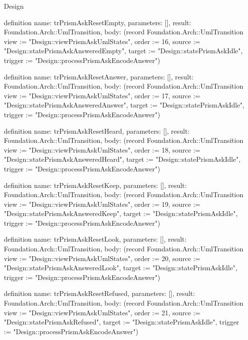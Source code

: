 \begin{lexlean}{Design}
\begin{semanticmodule}
definition{
  name: trPrismAskResetEmpty,
  parameters: [],
  result: Foundation.Arch::UmlTransition,
  body: (record Foundation.Arch::UmlTransition {view := "Design::viewPrismAskUmlStates", order := 16, source := "Design::statePrismAskAnsweredEmpty", target := "Design::statePrismAskIdle", trigger := "Design::processPrismAskEncodeAnswer"})
}

definition{
  name: trPrismAskResetAnswer,
  parameters: [],
  result: Foundation.Arch::UmlTransition,
  body: (record Foundation.Arch::UmlTransition {view := "Design::viewPrismAskUmlStates", order := 17, source := "Design::statePrismAskAnsweredAnswer", target := "Design::statePrismAskIdle", trigger := "Design::processPrismAskEncodeAnswer"})
}

definition{
  name: trPrismAskResetHeard,
  parameters: [],
  result: Foundation.Arch::UmlTransition,
  body: (record Foundation.Arch::UmlTransition {view := "Design::viewPrismAskUmlStates", order := 18, source := "Design::statePrismAskAnsweredHeard", target := "Design::statePrismAskIdle", trigger := "Design::processPrismAskEncodeAnswer"})
}

definition{
  name: trPrismAskResetKeep,
  parameters: [],
  result: Foundation.Arch::UmlTransition,
  body: (record Foundation.Arch::UmlTransition {view := "Design::viewPrismAskUmlStates", order := 19, source := "Design::statePrismAskAnsweredKeep", target := "Design::statePrismAskIdle", trigger := "Design::processPrismAskEncodeAnswer"})
}

definition{
  name: trPrismAskResetLook,
  parameters: [],
  result: Foundation.Arch::UmlTransition,
  body: (record Foundation.Arch::UmlTransition {view := "Design::viewPrismAskUmlStates", order := 20, source := "Design::statePrismAskAnsweredLook", target := "Design::statePrismAskIdle", trigger := "Design::processPrismAskEncodeAnswer"})
}

definition{
  name: trPrismAskResetRefused,
  parameters: [],
  result: Foundation.Arch::UmlTransition,
  body: (record Foundation.Arch::UmlTransition {view := "Design::viewPrismAskUmlStates", order := 21, source := "Design::statePrismAskRefused", target := "Design::statePrismAskIdle", trigger := "Design::processPrismAskEncodeAnswer"})
}
\end{semanticmodule}
\end{lexlean}
